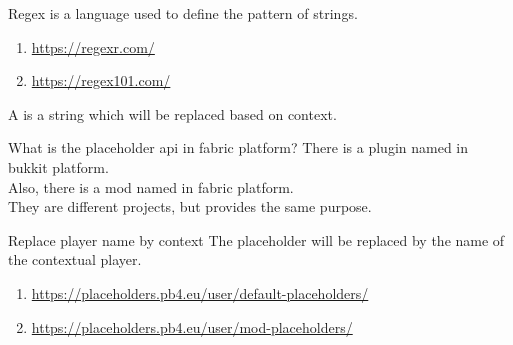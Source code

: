 \clearpage
{}

Regex is a language used to define the pattern of strings.

\begin{enumerate}
    \item \url{https://regexr.com/}
    \item \url{https://regex101.com/}
\end{enumerate}


\clearpage
{}

A  is a string which will be replaced based on context.

\begin{tips}{What is the placeholder api in fabric platform?}
    There is a plugin named  in bukkit platform.\\
    Also, there is a mod named  in fabric platform.\\
    They are different projects, but provides the same purpose.
\end{tips}

\begin{example}{Replace player name by context}
    The placeholder  will be replaced by the name of the contextual player.
\end{example}

\begin{enumerate}
    \item \url{https://placeholders.pb4.eu/user/default-placeholders/}
    \item \url{https://placeholders.pb4.eu/user/mod-placeholders/}
\end{enumerate}


